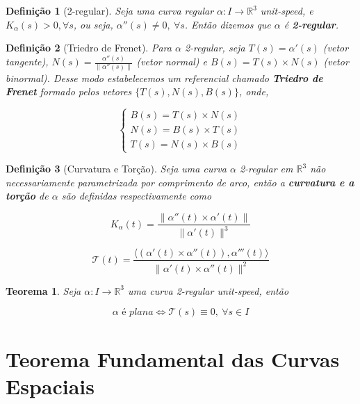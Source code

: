 \documentclass{article}
\newtheorem{theorem}{Teorema}
\newtheorem{definition}{Definição}
\begin{document}
\begin{definition}[2-regular]
Seja uma curva regular $\alpha: I \rightarrow \mathbb{R}^3$ \textit{unit-speed}, e $K_\alpha(s) > 0, \forall s$, ou seja, $\alpha''(s) \neq 0,\ \forall s$. Então dizemos que $\alpha$ é \textbf{2-regular}.
\end{definition}

\begin{definition}[Triedro de Frenet]
Para $\alpha$ 2-regular, seja $T(s) = \alpha'(s)$ (vetor tangente), $N(s) = \frac{\alpha''(s)}{\| \alpha''(s) \|}$ (vetor normal) e $B(s) = T(s) \times N(s)$ (vetor binormal). Desse modo estabelecemos um referencial chamado \textbf{Triedro de Frenet} formado pelos vetores $\{ T(s), N(s), B(s) \}$, onde,

$$ \left \{
\begin{array}{lll}
    B(s) = T(s) \times N(s) \\
    N(s) = B(s) \times T(s) \\
    T(s) = N(s) \times B(s)
\end{array} \right .
$$
\end{definition}

\begin{definition}[Curvatura e Torção]
Seja uma curva $\alpha$ 2-regular em $\mathbb{R}^3$ não necessariamente parametrizada por comprimento de arco, então a \textbf{curvatura e a torção} de $\alpha$ são definidas respectivamente como

$$K_\alpha(t) = \frac{\| \alpha''(t) \times \alpha'(t) \|}{\| \alpha'(t) \|^3}$$

$$\mathcal{T}(t) = \frac{\langle (\alpha'(t) \times \alpha''(t)), \alpha'''(t) \rangle}{\| \alpha'(t) \times \alpha''(t) \|^2}$$
\end{definition}

\begin{theorem}
Seja $\alpha: I \rightarrow \mathbb{R}^3$ uma curva 2-regular \textit{unit-speed}, então

$$\alpha \textit{ é plana} \Longleftrightarrow \mathcal{T}(s) \equiv 0,\ \forall s \in I$$
\end{theorem}

\section*{Teorema Fundamental das Curvas Espaciais}
\label{s6}
\end{document}
